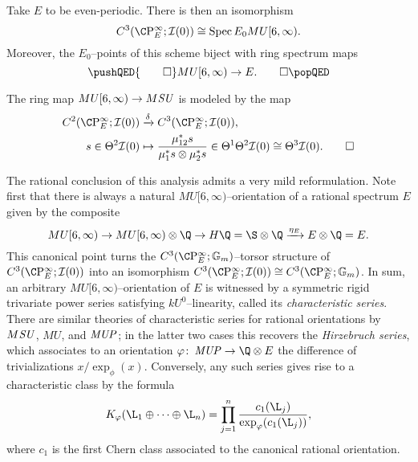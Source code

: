 \begin{corollary}\label{BU6Triumvirate}
Take \(E\) to be even-periodic.  There is then an isomorphism \[C^3(\CP^\infty_E; \sheaf I(0)) \cong \Spec E_0 MU[6, \infty).\]  Moreover, the \(E_0\)--points of this scheme biject with ring spectrum maps\index{orientation!MU six@\(MU[6, \infty)\)} \[\pushQED{\qed}MU[6, \infty) \to E. \qedhere\popQED\]
\end{corollary}

\begin{lemma}\label{MSUToMU6}
The ring map \(MU[6, \infty) \to M\mathit{SU}\) is modeled by the map
\begin{align*}
C^2(\CP^\infty_E; \sheaf I(0)) & \xrightarrow{\delta} C^3(\CP^\infty_E; \sheaf I(0)), \\
s \in \Theta^2 \sheaf I(0) & \mapsto \frac{\mu_{12}^* s}{\mu_1^* s \otimes \mu_2^* s} \in \Theta^1 \Theta^2 \sheaf I(0) \cong \Theta^3 \sheaf I(0). \qed
\end{align*}
\end{lemma}

\begin{remark}
The rational conclusion of this analysis admits a very mild reformulation.  Note first that there is always a natural \(MU[6, \infty)\)--orientation of a rational spectrum \(E\) given by the composite \[MU[6, \infty) \to MU[6, \infty) \otimes \Q \to H\Q = \S \otimes \Q \xrightarrow{\eta_E} E \otimes \Q = E.\]  This canonical point turns the \(C^3(\CP^\infty_E; \Gm)\)--torsor structure of \(C^3(\CP^\infty_E; \sheaf I(0))\) into an isomorphism \(C^3(\CP^\infty_E; \sheaf I(0)) \cong C^3(\CP^\infty_E; \Gm)\).  In sum, an arbitrary \(MU[6, \infty)\)--orientation of \(E\) is witnessed by a symmetric rigid trivariate power series satisfying \(kU^0\)--linearity, called its \textit{characteristic series}.  There are similar theories of characteristic series for rational orientations by \(M\mathit{SU}\), \(MU\), and \(\mathit{MUP}\); in the latter two cases this recovers the \textit{Hirzebruch series}, which associates to an orientation \(\phi\co \MUP \to \Q \otimes E\) the difference of trivializations \(x / \exp_\phi(x)\).  Conversely, any such series gives rise to a characteristic class by the formula \[K_\phi(\L_1 \oplus \cdots \oplus \L_n) = \prod_{j=1}^n \frac{c_1(\L_j)}{\exp_\phi(c_1(\L_j))},\] where \(c_1\) is the first Chern class associated to the canonical rational orientation.
\end{remark}

